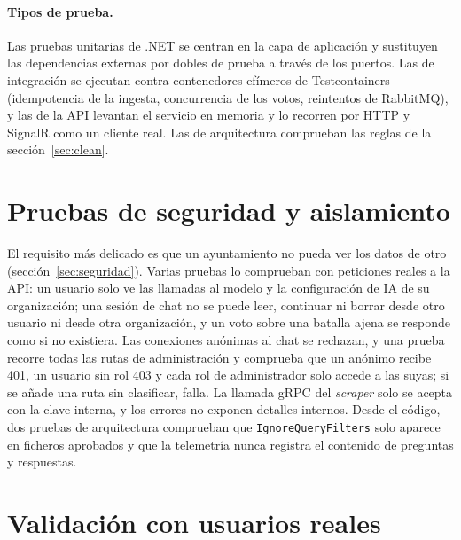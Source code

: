 \paragraph{Tipos de prueba.} Las pruebas unitarias de .NET se centran en la capa de aplicación y sustituyen las dependencias externas por dobles de prueba a través de los puertos. Las de integración se ejecutan contra contenedores efímeros de Testcontainers (idempotencia de la ingesta, concurrencia de los votos, reintentos de RabbitMQ), y las de la API levantan el servicio en memoria y lo recorren por HTTP y SignalR como un cliente real. Las de arquitectura comprueban las reglas de la sección~\ref{sec:clean}.

\section{Pruebas de seguridad y aislamiento}
\label{sec:pruebas-seguridad}

El requisito más delicado es que un ayuntamiento no pueda ver los datos de otro (sección~\ref{sec:seguridad}). Varias pruebas lo comprueban con peticiones reales a la API: un usuario solo ve las llamadas al modelo y la configuración de IA de su organización; una sesión de chat no se puede leer, continuar ni borrar desde otro usuario ni desde otra organización, y un voto sobre una batalla ajena se responde como si no existiera. Las conexiones anónimas al chat se rechazan, y una prueba recorre todas las rutas de administración y comprueba que un anónimo recibe 401, un usuario sin rol 403 y cada rol de administrador solo accede a las suyas; si se añade una ruta sin clasificar, falla. La llamada gRPC del \emph{scraper} solo se acepta con la clave interna, y los errores no exponen detalles internos. Desde el código, dos pruebas de arquitectura comprueban que \texttt{IgnoreQueryFilters} solo aparece en ficheros aprobados y que la telemetría nunca registra el contenido de preguntas y respuestas.

\section{Validación con usuarios reales}
\label{sec:validacion-usuarios}

